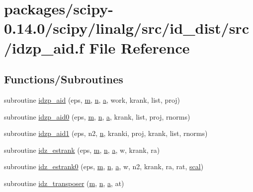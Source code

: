 \hypertarget{idzp__aid_8f}{}\section{packages/scipy-\/0.14.0/scipy/linalg/src/id\+\_\+dist/src/idzp\+\_\+aid.f File Reference}
\label{idzp__aid_8f}
\subsection*{Functions/\+Subroutines}
\begin{DoxyCompactItemize}
\item 
subroutine \hyperlink{idzp__aid_8f_ad5ee5002b262f59afc3100dab5e0006d}{idzp\+\_\+aid} (eps, \hyperlink{indexexpr_8h_ab72fdb4031d47b75ab26dd18a437bcdc}{m}, \hyperlink{indexexpr_8h_ab427e2e2b4d6cec55fa088ea2a692ace}{n}, \hyperlink{gen__mat5files_8m_aae328bf20413f220e38aec4d95bfd6da}{a}, work, krank, list, proj)
\item 
subroutine \hyperlink{idzp__aid_8f_abb7c2fcc8f3cbc2bcdd0984107eb4b26}{idzp\+\_\+aid0} (eps, \hyperlink{indexexpr_8h_ab72fdb4031d47b75ab26dd18a437bcdc}{m}, \hyperlink{indexexpr_8h_ab427e2e2b4d6cec55fa088ea2a692ace}{n}, \hyperlink{gen__mat5files_8m_aae328bf20413f220e38aec4d95bfd6da}{a}, krank, list, proj, rnorms)
\item 
subroutine \hyperlink{idzp__aid_8f_a9c393c6ebcceb6f52c5d821b9adfdc68}{idzp\+\_\+aid1} (eps, n2, \hyperlink{indexexpr_8h_ab427e2e2b4d6cec55fa088ea2a692ace}{n}, kranki, proj, krank, list, rnorms)
\item 
subroutine \hyperlink{idzp__aid_8f_a6d96604d2b842ae89570c943a974b62d}{idz\+\_\+estrank} (eps, \hyperlink{indexexpr_8h_ab72fdb4031d47b75ab26dd18a437bcdc}{m}, \hyperlink{indexexpr_8h_ab427e2e2b4d6cec55fa088ea2a692ace}{n}, \hyperlink{gen__mat5files_8m_aae328bf20413f220e38aec4d95bfd6da}{a}, w, krank, ra)
\item 
subroutine \hyperlink{idzp__aid_8f_af93699a7427155c7e50a2ab0889420a5}{idz\+\_\+estrank0} (eps, \hyperlink{indexexpr_8h_ab72fdb4031d47b75ab26dd18a437bcdc}{m}, \hyperlink{indexexpr_8h_ab427e2e2b4d6cec55fa088ea2a692ace}{n}, \hyperlink{gen__mat5files_8m_aae328bf20413f220e38aec4d95bfd6da}{a}, w, n2, krank, ra, rat, \hyperlink{dense_8h_a0440a74729365d9e7ed71b8f3927a27f}{scal})
\item 
subroutine \hyperlink{idzp__aid_8f_aaf526d88dc6b7f4b681ad4bfa5dcb4bb}{idz\+\_\+transposer} (\hyperlink{indexexpr_8h_ab72fdb4031d47b75ab26dd18a437bcdc}{m}, \hyperlink{indexexpr_8h_ab427e2e2b4d6cec55fa088ea2a692ace}{n}, \hyperlink{gen__mat5files_8m_aae328bf20413f220e38aec4d95bfd6da}{a}, at)
\end{DoxyCompactItemize}


